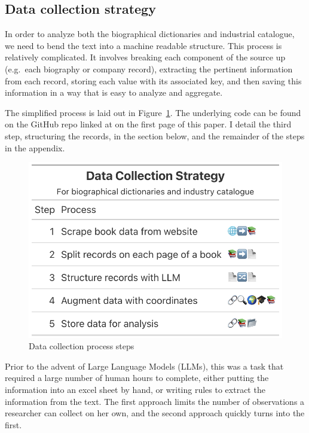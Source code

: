 \documentclass[
]{article}
\begin{document}
\hypertarget{data-collection-strategy}{%
\subsection{Data collection strategy}\label{data-collection-strategy}}

In order to analyze both the biographical dictionaries and industrial
catalogue, we need to bend the text into a machine readable structure.
This process is relatively complicated. It involves breaking each
component of the source up (e.g.~each biography or company record),
extracting the pertinent information from each record, storing each
value with its associated key, and then saving this information in a way
that is easy to analyze and aggregate.

The simplified process is laid out in
Figure~\ref{fig-data-collection-process}. The underlying code can be
found on the GitHub repo linked at on the first page of this paper. I
detail the third step, structuring the records, in the section below,
and the remainder of the steps in the appendix.

\begin{figure}

{\centering \includegraphics[width=5in,height=\textheight]{assets/data-collection-process.png}

}

\caption{\label{fig-data-collection-process}Data collection process
steps}

\end{figure}

Prior to the advent of Large Language Models (LLMs), this was a task
that required a large number of human hours to complete, either putting
the information into an excel sheet by hand, or writing rules to extract
the information from the text. The first approach limits the number of
observations a researcher can collect on her own, and the second
approach quickly turns into the first.
\end{document}
